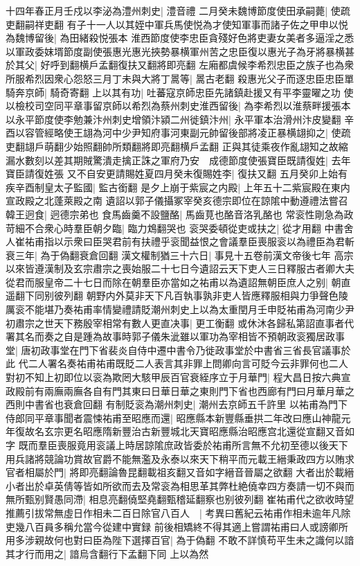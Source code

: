 十四年春正月壬戍以李泌為澧州刺史|{
	澧音禮}
二月癸未魏博節度使田承嗣薨|{
	使疏吏翻嗣祥吏翻}
有子十一人以其姪中軍兵馬使悦為才使知軍事而諸子佐之甲申以悦為魏博留後|{
	為田緒殺悦張本}
淮西節度使李忠臣貪殘好色將吏妻女美者多逼淫之悉以軍政委妺壻節度副使張惠光惠光挾勢暴横軍州苦之忠臣復以惠光子為牙將暴横甚於其父|{
	好呼到翻横戶孟翻復扶又翻將即亮翻}
左廂都虞候李希烈忠臣之族子也為衆所服希烈因衆心怨怒三月丁未與大將丁暠等|{
	暠古老翻}
殺惠光父子而逐忠臣忠臣單騎奔京師|{
	騎奇寄翻}
上以其有功|{
	吐蕃寇京師忠臣先諸鎮赴援又有平李靈曜之功}
使以檢校司空同平章事留京師以希烈為蔡州刺史淮西留後|{
	為李希烈以淮蔡畔援張本}
以永平節度使李勉兼汴州刺史增領汴潁二州徙鎮汴州|{
	永平軍本治滑州汴皮變翻}
辛酉以容管經略使王翃為河中少尹知府事河東副元帥留後部將凌正暴横翃抑之|{
	使疏吏翻翃戶萌翻少始照翻帥所類翻將即亮翻横戶孟翻}
正與其徒乘夜作亂翃知之故縮漏水數刻以差其期賊驚潰走擒正誅之軍府乃安　成德節度使張寶臣既請復姓|{
	去年寶臣請復姓張}
又不自安更請賜姓夏四月癸未復賜姓李|{
	復扶又翻}
五月癸卯上始有疾辛酉制皇太子監國|{
	監古銜翻}
是夕上崩于紫宸之内殿|{
	上年五十二紫宸殿在東内宣政殿之北蓬萊殿之南}
遺詔以郭子儀攝冢宰癸亥德宗即位在諒隂中動遵禮法嘗召韓王迥食|{
	迥德宗弟也}
食馬齒羹不設鹽酪|{
	馬齒莧也酪音洛乳酪也}
常衮性剛急為政苛細不合衆心時羣臣朝夕臨|{
	臨力鴆翻哭也}
衮哭委頓從吏或扶之|{
	從才用翻}
中書舍人崔祐甫指以示衆曰臣哭君前有扶禮乎衮聞益恨之會議羣臣喪服衮以為禮臣為君斬衰三年|{
	為于偽翻衰倉回翻}
漢文權制猶三十六日|{
	事見十五卷前漢文帝後七年}
高宗以來皆遵漢制及玄宗肅宗之喪始服二十七日今遺詔云天下吏人三日釋服古者卿大夫從君而服皇帝二十七日而除在朝羣臣亦當如之祐甫以為遺詔無朝臣庶人之别|{
	朝直遥翻下同别彼列翻}
朝野内外莫非天下凡百執事孰非吏人皆應釋服相與力爭聲色陵厲衮不能堪乃奏祐甫率情變禮請貶潮州刺史上以為太重閏月壬申貶祐甫為河南少尹初肅宗之世天下務殷宰相常有數人更直决事|{
	更工衡翻}
或休沐各歸私第詔直事者代署其名而奏之自是踵為故事時郭子儀朱泚雖以軍功為宰相皆不預朝政衮獨居政事堂|{
	唐初政事堂在門下省裴炎自侍中遷中書令乃徙政事堂於中書省三省長官議事於此}
代二人署名奏祐甫祐甫既貶二人表言其非罪上問卿向言可貶今云非罪何也二人對初不知上初即位以衮為欺罔大駭甲辰百官衰絰序立于月華門|{
	程大昌日按六典宣政殿前有兩廡兩廡各自有門其東曰日華日華之東則門下省也西廊有門曰月華月華之西則中書省也衰倉回翻}
有制貶衮為潮州刺史|{
	潮州去京師五千許里}
以祐甫為門下侍郎同平章事聞者震悚祐甫至昭應而還|{
	昭應縣本新豐縣垂拱二年改曰應山神龍元年復故名玄宗更名昭應隋新豐治古新豐城北天寶昭應縣治昭應宫北還從宣翻又音如字}
既而羣臣喪服竟用衮議上時居諒隂庶政皆委於祐甫所言無不允初至德以後天下用兵諸將競論功賞故官爵不能無濫及永泰以來天下稍平而元載王縉秉政四方以賄求官者相屬於門|{
	將即亮翻論魯昆翻載祖亥翻又音如字縉音晉屬之欲翻}
大者出於載縉小者出於卓英倩等皆如所欲而去及常衮為相思革其弊杜絶僥幸四方奏請一切不與而無所甄别賢愚同滯|{
	相息亮翻僥堅堯翻甄稽延翻察也别彼列翻}
崔祐甫代之欲收時望推薦引拔常無虛日作相未二百日除官八百人　|{
	考異曰舊紀云祐甫作相未逾年凡除吏幾八百員多稱允當今從建中實録}
前後相矯終不得其適上嘗謂祐甫曰人或謗卿所用多涉親故何也對曰臣為陛下選擇百官|{
	為于偽翻}
不敢不詳慎苟平生未之識何以諳其才行而用之|{
	諳烏含翻行下孟翻下同}
上以為然

